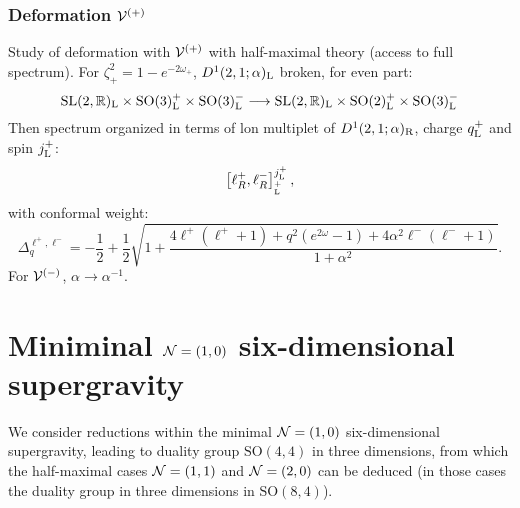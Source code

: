 \documentclass[11pt]{article}
\newcommand{\SO}{\ensuremath{\mathrm{SO}}\xspace}
\newcommand{\SL}{\ensuremath{\mathrm{SL}}\xspace}
\begin{document}
  \subsubsection{Deformation \texorpdfstring{${\cal V}^{(+)}$}{V+}}
  Study of deformation with ${\cal V}^{(+)}$ with half-maximal theory (access to full spectrum). For $\zeta^{2}_{+}=1-e^{-2\omega_{+}}$, $D^{1}(2,1;\alpha)_{\rm L}$ broken, for even part:
  \begin{equation}
    \SL(2,\mathbb{R})_{\rm L}\times\SO(3)^{+}_{\rm L}\times\SO(3)^{-}_{\rm L} \longrightarrow \SL(2,\mathbb{R})_{\rm L}\times\SO(2)^{+}_{\rm L}\times\SO(3)^{-}_{\rm L}
  \end{equation}
  Then spectrum organized in terms of lon multiplet of $D^{1}(2,1;\alpha)_{\rm R}$, charge $q_{\rm L}^{+}$ and spin $j_{\rm L}^{+}$:
  \begin{equation}
    \left[\ell^{+}_{R},\ell^{-}_{R}\right]^{j_{\rm L}^{+}}_{_{\rm L}^{+}},
  \end{equation}
  with conformal weight:
  \begin{equation}
    \Delta_{q}^{\ell^{+},\ell^{-}} = -\frac{1}{2} + \frac{1}{2}\sqrt{1+\frac{4\ell^{+}(\ell^{+}+1)+q^{2}(e^{2\omega}-1)+4\alpha^{2}\ell^{-}(\ell^{-}+1)}{1+\alpha^{2}}}.
  \end{equation}
  For ${\cal V}^{(-)}$, $\alpha\rightarrow\alpha^{-1}$.

\appendix

\section{Miniminal ${\cal N}=(1,0)$ six-dimensional supergravity}
We consider reductions within the minimal ${\cal N}=(1,0)$ six-dimensional supergravity, leading to duality group $\SO(4,4)$ in three dimensions, from which the half-maximal cases ${\cal N}=(1,1)$ and ${\cal N}=(2,0)$ can be deduced (in those cases the duality group in three dimensions in $\SO(8,4)$).
\end{document}
